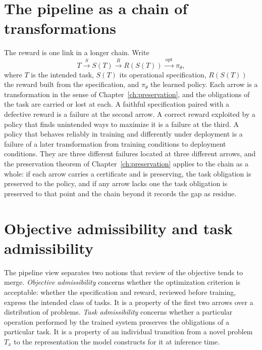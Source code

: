 \section{The pipeline as a chain of transformations}
\label{sec:pipeline19}

The reward is one link in a longer chain. Write
\[
T \xrightarrow{\ S\ } S(T) \xrightarrow{\ R\ } R(S(T)) \xrightarrow{\ \mathrm{opt}\ } \pi_\theta,
\]
where $T$ is the intended task, $S(T)$ its operational specification, $R(S(T))$ the reward built from the specification, and $\pi_\theta$ the learned policy. Each arrow is a transformation in the sense of Chapter~\ref{ch:preservation}, and the obligations of the task are carried or lost at each. A faithful specification paired with a defective reward is a failure at the second arrow. A correct reward exploited by a policy that finds unintended ways to maximize it is a failure at the third. A policy that behaves reliably in training and differently under deployment is a failure of a later transformation from training conditions to deployment conditions. They are three different failures located at three different arrows, and the preservation theorem of Chapter~\ref{ch:preservation} applies to the chain as a whole: if each arrow carries a certificate and is preserving, the task obligation is preserved to the policy, and if any arrow lacks one the task obligation is preserved to that point and the chain beyond it records the gap as residue.

\section{Objective admissibility and task admissibility}

The pipeline view separates two notions that review of the objective tends to merge. \emph{Objective admissibility} concerns whether the optimization criterion is acceptable: whether the specification and reward, reviewed before training, express the intended class of tasks. It is a property of the first two arrows over a distribution of problems. \emph{Task admissibility} concerns whether a particular operation performed by the trained system preserves the obligations of a particular task. It is a property of an individual transition from a novel problem $T_x$ to the representation the model constructs for it at inference time.

